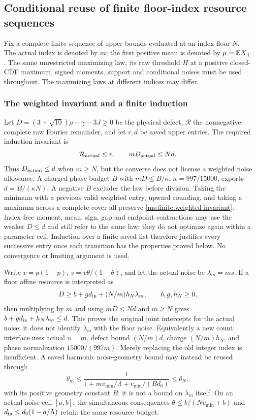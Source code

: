 \subsection{Conditional reuse of finite floor-index resource sequences}
\label{ms:finite:floor-transfer}
Fix a complete finite sequence of upper bounds evaluated at an index
floor $N$. The actual index is denoted by $m$; the first positive mean is denoted by $\mu=\mathbb E X_+$. The same
unrestricted maximizing law, its raw threshold $H$ at a positive closed-CDF
maximum, signed moments, support and conditional noises must be used throughout.
The maximizing laws at different indices may differ.

\subsubsection{The weighted invariant and a finite induction}
\label{ms:finite:weighted-induction}
Let $D=(3+\sqrt{10})\rho-\gamma-3J\ge0$ be the physical defect,
$\mathcal R$ the nonnegative complete raw Fourier remainder, and let
$r,d$ be saved upper entries. The required induction invariant is
\begin{equation}\label{ms:finite:weighted-invariant}
 \mathcal R_{\rm actual}\le r,\qquad mD_{\rm actual}\le Nd.
\end{equation}
Thus $D_{\rm actual}\le d$ when $m\ge N$, but the converse does
not license a weighted noise allowance. A charged phase budget $B$ with
$mD\le B/\kappa$, $\kappa=997/15000$, exports
$d=B/(\kappa N)$. A negative $B$ excludes the law before division.
Taking the minimum with a previous valid weighted entry, upward rounding,
and taking a maximum across a complete cover all preserve
\eqref{ms:finite:weighted-invariant}. Index-free moment, mean, sign,
gap and endpoint contractions may use the weaker $D\le d$ and still
refer to the same law; they do not optimize again within a parameter cell.
Induction over a finite saved list therefore justifies every successive
entry once each transition has the properties proved below. No convergence
or limiting argument is used.

Write $v=p(1-p)$, $s=v\theta/(1-\theta)$, and let the actual noise be
$\lambda_m=ms$. If a floor affine resource is interpreted as
\begin{equation}\label{ms:finite:scaled-charge}
 D\ge b+g d_{\rm in}+(N/m)h_N\lambda_m,
 \qquad b,g,h_N\ge0,
\end{equation}
then multiplying by $m$ and using $mD\le Nd$ and $m\ge N$ gives
$b+g d_{\rm in}+h_N\lambda_m\le d$.
This proves the original joint intercepts for the actual noise; it does
not identify $\lambda_m$ with the floor noise. Equivalently a new count
interface uses actual $n=m$, defect bound $(N/m)d$, charge $(N/m)h_N$,
and phase normalization $15000/(997m)$. Merely replacing the old integer
index is insufficient. A saved harmonic noise-geometry bound may instead
be reused through
\[
 \theta_m\le\frac1{1+mv_{\min}/\Lambda+v_{\min}/(B d_0)}
 \le\theta_N,
\]
with its positive geometry constant $B$; it is not a bound on
$\lambda_m$ itself. On an actual noise cell $[a,b]$, the simultaneous
consequences $\theta\le b/(Nv_{\min}+b)$ and
$d_{\rm in}\le d_0(1-a/\Lambda)$ retain the same resource budget.

